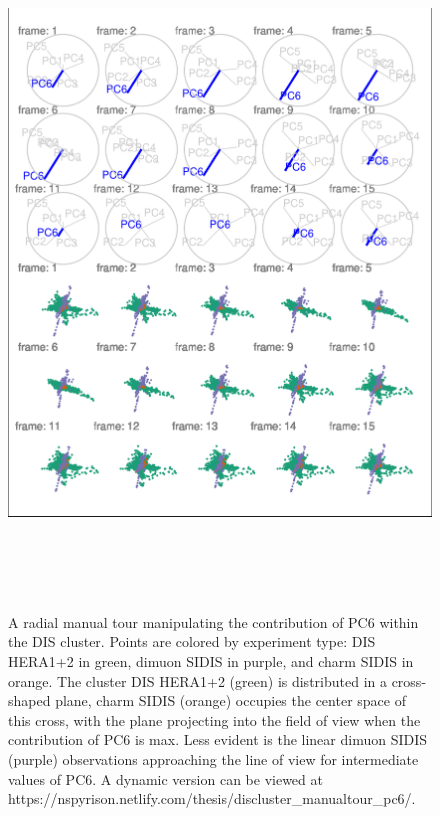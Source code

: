 \begin{Schunk}
\begin{figure}

{\centering \includegraphics[width=6in,height=7.2in]{spinifex_paper_files/figure-latex/DISclusterGood-1} 

}

\caption[A radial manual tour manipulating the contribution of  PC6 within the DIS cluster]{A radial manual tour manipulating the contribution of  PC6 within the DIS cluster. Points are colored by experiment type: DIS HERA1+2 in green, dimuon SIDIS in purple, and charm SIDIS in orange. The cluster DIS HERA1+2 (green) is distributed in a cross-shaped plane, charm SIDIS (orange) occupies the center space of this cross, with the plane projecting into the field of view when the contribution of PC6 is max. Less evident is the linear dimuon SIDIS (purple) observations approaching the line of view for intermediate values of PC6. A dynamic version can be viewed at https://nspyrison.netlify.com/thesis/discluster\_manualtour\_pc6/.}\label{fig:DISclusterGood}
\end{figure}
\end{Schunk}


